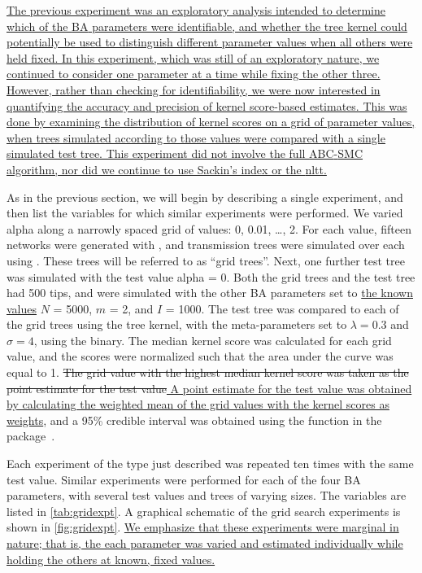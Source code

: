 {\color{blue}\uline{The previous experiment was an exploratory analysis
intended to determine which of the \gls{BA} parameters were identifiable, and
whether the tree kernel could potentially be used to distinguish different
parameter values when all others were held fixed. In this experiment, which was
still of an exploratory nature, we continued to consider one parameter at a
time while fixing the other three. However, rather than checking for
identifiability, we were now interested in quantifying the accuracy and
precision of kernel score-based estimates. This was done by examining the
distribution of kernel scores on a grid of parameter values, when trees
simulated according to those values were compared with a single simulated test
tree. This experiment did not involve the full \gls{ABC}-\gls{SMC} algorithm,
nor did we continue to use Sackin's index or the \gls{nltt}.}}

As in the previous section, we will begin by describing a single experiment,
and then list the variables for which similar experiments were performed. We
varied \gls{alpha} along a narrowly spaced grid of values: 0, 0.01, \ldots, 2.
For each value, fifteen networks were generated with , and
transmission trees were simulated over each using . These
trees will be referred to as ``grid trees''. Next, one further test tree was
simulated with the test value \gls{alpha} = 0. Both the grid trees and the test
tree had 500 tips, and were simulated with the other \gls{BA} parameters set to
{\color{blue}\uline{the known values}} $N$ = 5000, $m$ = 2, and $I$ = 1000. The
test tree was compared to each of the grid trees using the tree kernel, with
the meta-parameters set to $\lambda = 0.3$ and $\sigma = 4$, using the
 binary. The median kernel score was calculated for each
grid value, and the scores were normalized such that the area under the curve
was equal to 1. {\color{red}\sout{The grid value with the highest median kernel
score was taken as the point estimate for the test value}}{\color{blue}\uline{
A point estimate for the test value was obtained by calculating the weighted
mean of the grid values with the kernel scores as weights}}, and a 95\%
credible interval was obtained using the  function in the
 package~\autocite{snow2013teachingdemos}.

Each experiment of the type just described was repeated ten times with the same
test value. Similar experiments were performed for each of the four \gls{BA}
parameters, with several test values and trees of varying sizes. The variables
are listed in \cref{tab:gridexpt}. A graphical schematic of the grid search
experiments is shown in \cref{fig:gridexpt}. {\color{blue}\uline{We emphasize
that these experiments were marginal in nature; that is, the each parameter was
varied and estimated individually while holding the others at known, fixed
values.}}

